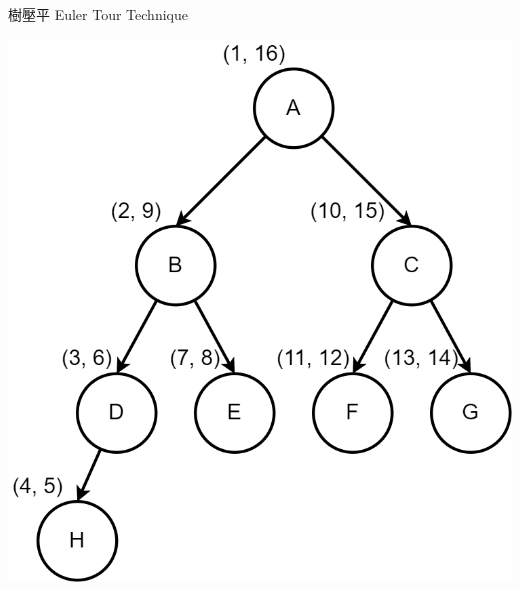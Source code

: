 \documentclass[aspectratio=169]{beamer}
\begin{document}
    \begin{frame}{樹壓平 Euler Tour Technique}
        \begin{center}
            \includegraphics[height=0.8\textheight]{src/ett_2.png}
        \end{center}
    \end{frame}
\end{document}
